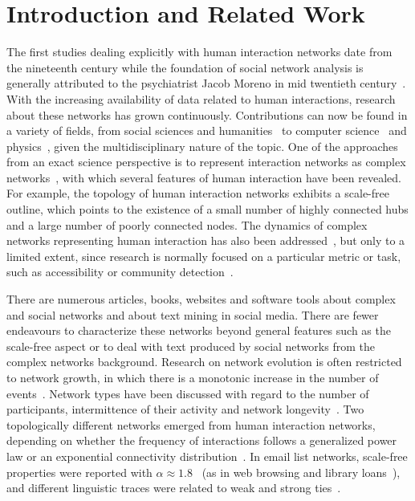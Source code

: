 
\chapter{Introduction and Related Work}\label{ch:int}

The first studies dealing explicitly with human interaction networks
date from the nineteenth century while the foundation of
social network analysis is generally attributed to the psychiatrist Jacob Moreno in mid twentieth century~\cite{moreno,newmanBook}.
With the increasing availability of data related to human interactions, research about these networks has grown continuously.
Contributions can now be found in a variety of fields, from social sciences and humanities~\cite{latour2013} to computer science~\cite{bird} and physics~\cite{barabasiHumanDyn,newmanFriendship}, given the multidisciplinary nature of the topic.
One of the approaches from an exact science perspective is to represent interaction networks as complex networks~\cite{barabasiHumanDyn,newmanFriendship}, with which 
several features of human interaction have been revealed.
For example, the topology of human interaction networks exhibits a scale-free outline,
which points to the existence of a small number of highly connected hubs and a large number of poorly connected nodes.
The dynamics of complex networks representing human interaction has also been addressed~\cite{barabasiEvo,newmanEvolving}, but only to a limited extent, since research is normally focused on a particular metric or task, such as accessibility or community detection~\cite{access,newmanModularity}. 

There are numerous articles, books, websites and software tools about complex and social networks and about text mining in social media.
There are fewer endeavours to characterize these networks beyond general features such as the scale-free 
aspect or to deal with text produced by social networks from the complex networks background.
Research on network evolution is often restricted to network growth, in which there is a monotonic increase in the number of events~\cite{barabasiEvo}.
Network types have been discussed with regard to the number of participants, intermittence of their activity and network longevity~\cite{barabasiEvo}. Two topologically different networks emerged from human interaction networks, depending on whether the frequency of interactions follows a generalized power law or an exponential connectivity distribution~\cite{barabasiTopologicalEv}. In email list networks, scale-free properties were reported with $\alpha \approx 1.8$~\cite{bird} (as in web browsing and library loans~\cite{barabasiHumanDyn}), and different linguistic traces were related to weak and strong ties~\cite{Gmane2}.

